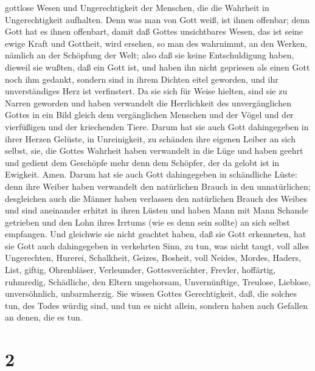 gottlose Wesen und Ungerechtigkeit der Menschen, die die Wahrheit in
Ungerechtigkeit aufhalten.  Denn was man von Gott weiß, ist
ihnen offenbar; denn Gott hat es ihnen offenbart,  damit
daß Gottes unsichtbares Wesen, das ist seine ewige Kraft und Gottheit,
wird ersehen, so man des wahrnimmt, an den Werken, nämlich an der
Schöpfung der Welt; also daß sie keine Entschuldigung haben,
 dieweil sie wußten, daß ein Gott ist, und haben ihn nicht
gepriesen als einen Gott noch ihm gedankt, sondern sind in ihrem Dichten
eitel geworden, und ihr unverständiges Herz ist verfinstert.
 Da sie sich für Weise hielten, sind sie zu Narren geworden
 und haben verwandelt die Herrlichkeit des unvergänglichen
Gottes in ein Bild gleich dem vergänglichen Menschen und der Vögel und
der vierfüßigen und der kriechenden Tiere.  Darum hat sie
auch Gott dahingegeben in ihrer Herzen Gelüste, in Unreinigkeit, zu
schänden ihre eigenen Leiber an sich selbst,  sie, die
Gottes Wahrheit haben verwandelt in die Lüge und haben geehrt und
gedient dem Geschöpfe mehr denn dem Schöpfer, der da gelobt ist in
Ewigkeit. Amen.  Darum hat sie auch Gott dahingegeben in
schändliche Lüste: denn ihre Weiber haben verwandelt den natürlichen
Brauch in den unnatürlichen;  desgleichen auch die Männer
haben verlassen den natürlichen Brauch des Weibes und sind aneinander
erhitzt in ihren Lüsten und haben Mann mit Mann Schande getrieben und
den Lohn ihres Irrtums (wie es denn sein sollte) an sich selbst
empfangen.  Und gleichwie sie nicht geachtet haben, daß sie
Gott erkenneten, hat sie Gott auch dahingegeben in verkehrten Sinn, zu
tun, was nicht taugt,  voll alles Ungerechten, Hurerei,
Schalkheit, Geizes, Bosheit, voll Neides, Mordes, Haders, List, giftig,
Ohrenbläser,  Verleumder, Gottesverächter, Frevler,
hoffärtig, ruhmredig, Schädliche, den Eltern ungehorsam, 
Unvernünftige, Treulose, Lieblose, unversöhnlich, unbarmherzig.
 Sie wissen Gottes Gerechtigkeit, daß, die solches tun, des
Todes würdig sind, und tun es nicht allein, sondern haben auch Gefallen
an denen, die es tun.

\hypertarget{section-1}{%
\section{2}\label{section-1}}

